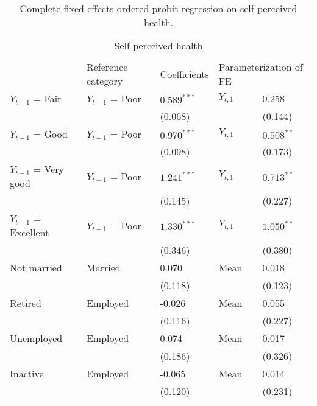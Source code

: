 \documentclass[12pt]{article}
\begin{document}
\begin{table}[h!]
\centering
\footnotesize
\caption*{Complete fixed effects ordered probit regression on self-perceived health.}
\label{table1}
\begin{tabular}{ll l l l}
\hline
\multicolumn{5}{c}{Self-perceived health} \\\\
 & \multicolumn{1}{l}{Reference category} & \multicolumn{1}{l}{Coefficients} & \multicolumn{2}{l}{Parameterization of FE}\\\hline\hline
$Y_{t-1}$ = Fair            & $Y_{t-1}$ = Poor &  $0.589^{***}$ & $Y_{t,1}$ &  0.258\\
                            &                  & (0.068)        &           &  (0.144)\\
$Y_{t-1}$ = Good            & $Y_{t-1}$ = Poor & $0.970^{***}$  & $Y_{t,1}$ &  $0.508^{**}$\\
                            &                  & (0.098)        &           &  (0.173)\\
$Y_{t-1}$ = Very good       & $Y_{t-1}$ = Poor & $1.241^{***}$  & $Y_{t,1}$ &  $0.713^{**}$\\
                            &                  & (0.145)        &           &  (0.227)\\
$Y_{t-1}$ = Excellent       & $Y_{t-1}$ = Poor & $1.330^{***}$  & $Y_{t,1}$ &  $1.050^{**}$\\
                            &                  & (0.346)        &           &  (0.380)\\
Not married                 & Married          & 0.070          & Mean      &  0.018\\
                            &                  & (0.118)        &           &  (0.123)\\
Retired                     & Employed         & -0.026         & Mean      &  0.055\\
                            &                  & (0.116)        &           &  (0.227)\\
Unemployed                  & Employed         & 0.074          & Mean      &  0.017\\
                            &                  & (0.186)        &           &  (0.326)\\
Inactive                    & Employed         & -0.065         & Mean      &  0.014\\
                            &                  & (0.120)        &           &  (0.231)\\

\end{tabular}
\end{table}
\end{document}
